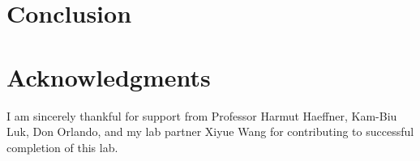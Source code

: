 \documentclass{sigchi}
\begin{document}
\section{Conclusion}\label{sec:conclusion}


\section*{Acknowledgments}
I am sincerely thankful for support from Professor Harmut Haeffner, Kam-Biu Luk, Don Orlando, and my lab partner Xiyue Wang for contributing to successful completion of this lab.



\end{document}
